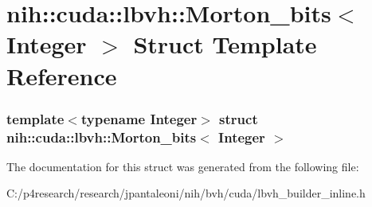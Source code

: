 \hypertarget{structnih_1_1cuda_1_1lbvh_1_1_morton__bits}{
\section{nih\-:\-:cuda\-:\-:lbvh\-:\-:\-Morton\-\_\-bits$<$ \-Integer $>$ \-Struct \-Template \-Reference}
\label{structnih_1_1cuda_1_1lbvh_1_1_morton__bits}
}
\subsubsection*{template$<$typename Integer$>$ struct nih\-::cuda\-::lbvh\-::\-Morton\-\_\-bits$<$ Integer $>$}



\-The documentation for this struct was generated from the following file\-:\begin{DoxyCompactItemize}
\item 
\-C\-:/p4research/research/jpantaleoni/nih/bvh/cuda/lbvh\-\_\-builder\-\_\-inline.\-h\end{DoxyCompactItemize}
